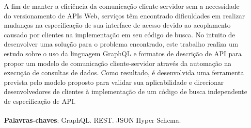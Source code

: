 \begin{resumo}
  A fim de manter a eficiência da comunicação cliente-servidor sem a necessidade do versionamento de APIs Web, serviços têm encontrado dificuldades em realizar mudanças na especificação de sua interface de acesso devido ao acoplamento causado por clientes na implementação em seu código de busca. No intuito de desenvolver uma solução para o problema encontrado, este trabalho realiza um estudo sobre o uso da linguagem GraphQL e formatos de descrição de API para propor um modelo de comunicação cliente-servidor através da automação na execução de consultas de dados. Como resultado, é desenvolvida uma ferramenta prevista pelo modelo proposto para validar sua aplicabilidade e direcionar desenvolvedores de clientes à implementação de um código de busca independente de especificação de API. \\ \\
  \textbf{Palavras-chaves}: GraphQL. REST. JSON Hyper-Schema.
\end{resumo}
